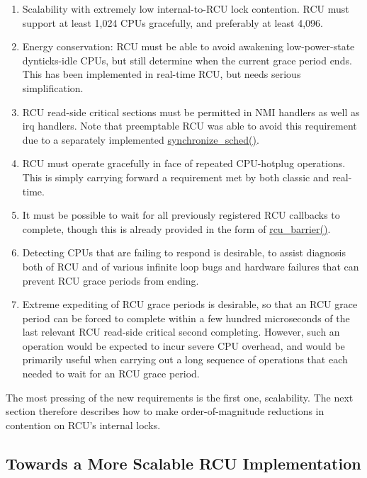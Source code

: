 \begin{enumerate}
\item	Scalability with extremely low internal-to-RCU lock contention.
	RCU must support at least 1,024 CPUs gracefully, and preferably
	at least 4,096.
\item	Energy conservation: RCU must be able to avoid awakening
	low-power-state dynticks-idle CPUs, but still determine
	when the current grace period ends.
	This has been implemented in real-time RCU, but needs serious
	simplification.
\item	RCU read-side critical sections must be permitted in NMI
	handlers as well as irq handlers.  Note that preemptable RCU
	was able to avoid this requirement due to a separately
	implemented \url{synchronize_sched()}.
\item	RCU must operate gracefully in face of repeated CPU-hotplug
	operations.
	This is simply carrying forward a requirement met by both
	classic and real-time.
\item	It must be possible to wait for all previously registered
	RCU callbacks to complete, though this is already provided
	in the form of \url{rcu_barrier()}.
\item	Detecting CPUs that are failing to respond is desirable,
	to assist diagnosis both of RCU and of various infinite
	loop bugs and hardware failures that can prevent RCU grace
	periods from ending.
\item	Extreme expediting of RCU grace periods is desirable,
	so that an RCU grace period can be forced to complete within
	a few hundred microseconds of the last relevant RCU read-side
	critical second completing.
	However, such an operation would be expected to incur
	severe CPU overhead, and would be primarily useful when
	carrying out a long sequence of operations that each needed
	to wait for an RCU grace period.
\end{enumerate}

The most pressing of the new requirements is the first one, scalability.
The next section therefore describes how to make order-of-magnitude reductions
in contention on RCU's internal locks.

\subsection{Towards a More Scalable RCU Implementation}
\label{app:rcuimpl:rcutree:Towards a More Scalable RCU Implementation}


